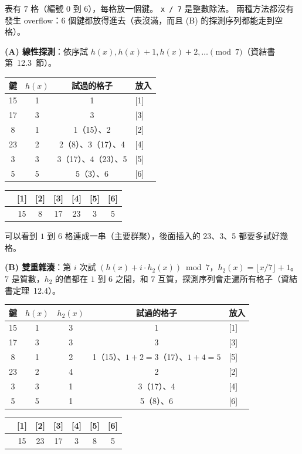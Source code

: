 \begin{pastsoln}
表有 $7$ 格（編號 $0$ 到 $6$），每格放一個鍵。 \texttt{x / 7} 是整數除法。 兩種方法都沒有發生
overflow：$6$ 個鍵都放得進去（表沒滿，而且 (B) 的探測序列都能走到空格）。

\textbf{(A) 線性探測}：依序試 $h(x), h(x) + 1, h(x) + 2, \ldots \pmod 7$（資結書第~12.3~節）。
\begin{center}
\small
\begin{tabular}{cccl}
\toprule
鍵 & $h(x)$ & 試過的格子 & 放入 \\
\midrule
15 & 1 & 1 & [1] \\
17 & 3 & 3 & [3] \\
8 & 1 & 1（15）、2 & [2] \\
23 & 2 & 2（8）、3（17）、4 & [4] \\
3 & 3 & 3（17）、4（23）、5 & [5] \\
5 & 5 & 5（3）、6 & [6] \\
\bottomrule
\end{tabular}
\end{center}
\begin{center}
\begin{tabular}{|*{7}{c|}}
\hline
[0] & [1] & [2] & [3] & [4] & [5] & [6] \\ \hline
 & 15 & 8 & 17 & 23 & 3 & 5 \\ \hline
\end{tabular}
\end{center}
可以看到 $1$ 到 $6$ 格連成一串（主要群聚），後面插入的 23、3、5 都要多試好幾格。

\textbf{(B) 雙重雜湊}：第 $i$ 次試 $(h(x) + i \cdot h_2(x)) \bmod 7$，$h_2(x) = \lfloor x/7 \rfloor + 1$。
$7$ 是質數，$h_2$ 的值都在 $1$ 到 $6$ 之間，和 $7$ 互質，探測序列會走遍所有格子（資結書定理~12.4）。
\begin{center}
\small
\begin{tabular}{ccccl}
\toprule
鍵 & $h(x)$ & $h_2(x)$ & 試過的格子 & 放入 \\
\midrule
15 & 1 & 3 & 1 & [1] \\
17 & 3 & 3 & 3 & [3] \\
8 & 1 & 2 & 1（15）、$1 + 2 = 3$（17）、$1 + 4 = 5$ & [5] \\
23 & 2 & 4 & 2 & [2] \\
3 & 3 & 1 & 3（17）、4 & [4] \\
5 & 5 & 1 & 5（8）、6 & [6] \\
\bottomrule
\end{tabular}
\end{center}
\begin{center}
\begin{tabular}{|*{7}{c|}}
\hline
[0] & [1] & [2] & [3] & [4] & [5] & [6] \\ \hline
 & 15 & 23 & 17 & 3 & 8 & 5 \\ \hline
\end{tabular}
\end{center}
\end{pastsoln}
